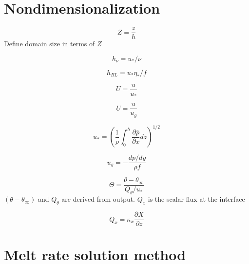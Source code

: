 \documentclass[letterpaper,10pt]{report}
\begin{document}
    \section{Nondimensionalization}
    
    \begin{equation}
        Z = \frac{z}{h}
    \end{equation}
    Define domain size in terms of $Z$
    
    \begin{equation}
        h_{\nu} = u_*/\nu
    \end{equation}
    
    \begin{equation}
        h_{BL} = u_* \eta_*/f
    \end{equation}
    
    \begin{equation}
        U = \frac{u}{u_*}
    \end{equation}
    
    \begin{equation}
        U = \frac{u}{u_g}
    \end{equation}
    
    \begin{equation}
        u_* = (\frac{1}{\rho}\int_0^h \frac{\partial \overline{p}}{\partial x} dz)^{1/2} 
    \end{equation}
    
    \begin{equation}
        u_g = - \frac{dp/dy}{\rho f}
    \end{equation}

    \begin{equation}
        \Theta = \frac{\theta - \theta_\infty}{Q_\theta/u_*}
    \end{equation}
    $(\theta - \theta_\infty)$ and $Q_\theta$ are derived from output. $Q_x$ is the scalar flux at the interface
    
    \begin{equation}
        Q_x = \kappa_x \frac{\partial X}{\partial z}
    \end{equation}

    \newpage
    
    \section{Melt rate solution method}
	
\end{document}
